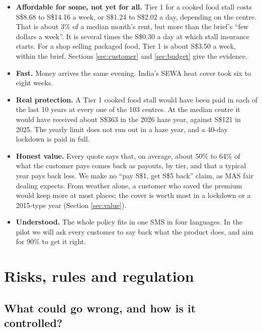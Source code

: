 \documentclass[11pt,a4paper]{article}
\newcommand{\sgd}{\textup{S\$}}
\begin{document}
\begin{itemize}[leftmargin=1.2em]
  \item \textbf{Affordable for some, not yet for all.} Tier 1 for a cooked food stall costs \sgd 8.68 to \sgd 14.16 a week, or \sgd 1.24 to \sgd 2.02 a day, depending on the centre. That is about 3\% of a median month's rent, but more than the brief's ``few dollars a week''.\cite{ps} It is several times the \sgd 0.30 a day at which stall insurance starts.\cite{income-stall} For a shop selling packaged food, Tier 1 is about \sgd 3.50 a week, within the brief. Sections \ref{sec:customer} and \ref{sec:budget} give the evidence.
  \item \textbf{Fast.} Money arrives the same evening. India's SEWA heat cover took six to eight weeks.\cite{ps}
  \item \textbf{Real protection.} A Tier 1 cooked food stall would have been paid in each of the last 10 years at every one of the 103 centres. At the median centre it would have received about \sgd 363 in the 2026 haze year, against \sgd 121 in 2025.\cite{team-data} The yearly limit does not run out in a haze year, and a 40-day lockdown is paid in full.
  \item \textbf{Honest value.} Every quote says that, on average, about 50\% to 64\% of what the customer pays comes back as payouts, by tier, and that a typical year pays back less. We make no ``pay \sgd 1, get \sgd 5 back'' claim, as MAS fair dealing expects.\cite{mas-fd} From weather alone, a customer who saved the premium would keep more at most places; the cover is worth most in a lockdown or a 2015-type year (Section \ref{sec:value}).
  \item \textbf{Understood.} The whole policy fits in one SMS in four languages. In the pilot we will ask every customer to say back what the product does, and aim for 90\% to get it right.
\end{itemize}

\section{Risks, rules and regulation}\label{sec:risk}

\subsection{What could go wrong, and how is it controlled?}
\end{document}
